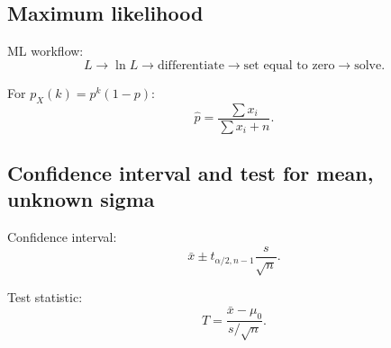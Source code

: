 \documentclass[11pt,a4paper]{article}
\begin{document}
\subsection*{Maximum likelihood}
ML workflow:
\[
L \rightarrow \ln L \rightarrow \text{differentiate} \rightarrow \text{set equal to zero} \rightarrow \text{solve}.
\]

For \(p_X(k)=p^k(1-p)\):
\[
\hat p=\frac{\sum x_i}{\sum x_i+n}.
\]

\subsection*{Confidence interval and test for mean, unknown sigma}
Confidence interval:
\[
\bar{x}\pm t_{\alpha/2,n-1}\frac{s}{\sqrt{n}}.
\]

Test statistic:
\[
T=\frac{\bar{x}-\mu_0}{s/\sqrt{n}}.
\]
\end{document}
